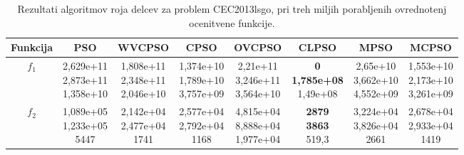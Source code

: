 \begin{table}[t]
\begin{small}
\begin{tabular}{|c|c|c|c|c|c|c|c|}
    \end{tabular}
\end{small}
\end{table}

\begin{table}[t]
    \renewcommand{\arraystretch}{1.1}
    \centering
    \caption{Rezultati algoritmov roja delcev za problem CEC2013lsgo, pri treh miljih porabljenih ovrednotenj ocenitvene funkcije.} \label{tab:bech:opt_three_stats}
    \begin{small}
    \begin{tabular}{|c|c|c|c|c|c|c|c|}
        \hline
        Funkcija & PSO & WVCPSO & CPSO & OVCPSO & CLPSO & MPSO & MCPSO \\\hline
        $f_1$    & \makecell{2,629e+11 \\ 2,873e+11 \\ 1,358e+10} & \makecell{1,808e+11 \\ 2,348e+11 \\ 2,046e+10} & \makecell{1,374e+10 \\ 1,789e+10 \\ 3,757e+09} & \makecell{2,21e+11 \\ 3,246e+11 \\ 3,564e+10} & \makecell{\textbf{0} \\ \textbf{1,785e+08} \\ 1,49e+08}          & \makecell{2,65e+10 \\ 3,662e+10 \\ 4,552e+09}  & \makecell{1,553e+10 \\ 2,173e+10 \\ 3,261e+09} \\\hline
        $f_2$    & \makecell{1,089e+05 \\ 1,233e+05 \\ 5447}      & \makecell{2,142e+04 \\ 2,477e+04 \\ 1741}      & \makecell{2,577e+04 \\ 2,792e+04 \\ 1168}      & \makecell{4,815e+04 \\ 8,888e+04 \\ 1,977e+04} & \makecell{\textbf{2879} \\ \textbf{3863} \\ 519,3}               & \makecell{3,224e+04 \\ 3,826e+04 \\ 2661}      & \makecell{2,678e+04 \\ 2,933e+04 \\ 1419}      \\\hline

\end{tabular}
\end{small}
\end{table}
